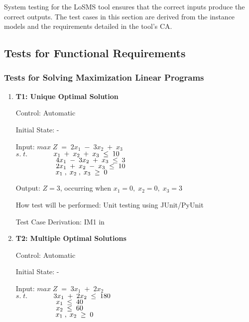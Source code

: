 \documentclass[12pt, titlepage]{article}
\newcommand{\famname}{LoSMS} %
\begin{document}
System testing for the \famname{} tool ensures that the correct inputs produce 
the correct outputs. The test cases in this section are derived from the 
instance models and the requirements detailed in the tool's CA.
	
\subsection{Tests for Functional Requirements}

\subsubsection{Tests for Solving Maximization Linear Programs}

\begin{enumerate}
	\item{\textbf{T1: Unique Optimal Solution}}
	
	Control: Automatic 
	
	Initial State: -
	
	Input: $max\;Z\;=\;2x_1\;-\;3x_2\;+\;x_3$\\
	$s.\;t.$$\hspace*{1.3cm} x_1\;+\;x_2\;+\;x_3\; \leq \;10$\\
	$\hspace*{2cm} 4x_1\;-\;3x_2\;+\;x_3\; \leq \;3$\\
	$\hspace*{2cm} 2x_1\;+\;x_2\;-\;x_3\; \leq \;10$\\
	$\hspace*{2cm} x_1\;,\;x_2\;,\;x_3\; \geq \;0$
	
	Output: $Z = 3$, occurring when $x_1=0,\;x_2=0,\;x_3=3$
	
	How test will be performed: Unit testing using JUnit/PyUnit
	
	Test Case Derivation: IM1 in \cite{losms-ca}

	\item{\textbf{T2: Multiple Optimal Solutions}}
	
	Control: Automatic 
	
	Initial State: -
	
	Input: $max\;Z\;=\;3x_1\;+\;2x_2$\\
	$s.\;t.$$\hspace*{1.3cm} 3x_1\;+\;2x_2\; \leq \;180$\\
	$\hspace*{2cm} x_1\; \leq \;40$\\
	$\hspace*{2cm} x_2\; \leq \;60$\\
	$\hspace*{2cm} x_1\;,\;x_2\; \geq \;0$
	

\end{enumerate}
\end{document}
